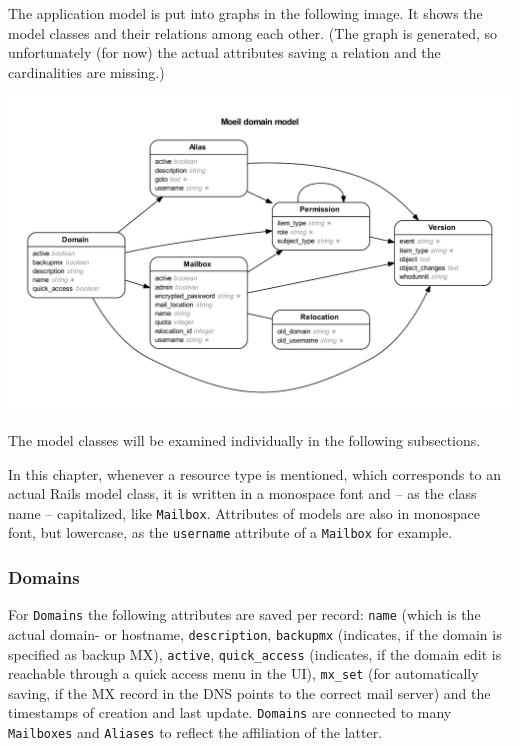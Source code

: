\documentclass[12pt,a4paper]{scrartcl}
\begin{document}
			The application model is put into graphs in the following image. It
			shows the model classes and their relations among each other. (The
			graph is generated, so unfortunately (for now) the actual
			attributes saving a relation and the cardinalities are missing.)

			\includegraphics[width=\textwidth]{images/erd.pdf}

			The model classes will be examined individually in the following
			subsections.
			\s

			In this chapter, whenever a resource type is mentioned, which
			corresponds to an actual \ac{Rails} model class, it is written in a
			monospace font and -- as the class name -- capitalized, like
			\texttt{Mailbox}. Attributes of models are also in monospace font,
			but lowercase, as the \texttt{username} attribute of a
			\texttt{Mailbox} for example.

			\subsubsection*{Domains}
				For \texttt{Domains} the following attributes are saved per
				record: \texttt{name} (which is the actual domain- or hostname,
				\texttt{description}, \texttt{backupmx} (indicates, if the
				domain is specified as backup MX), \texttt{active},
				\texttt{quick\_access} (indicates, if the domain edit is
				reachable through a quick access menu in the \ac{UI}),
				\texttt{mx\_set} (for automatically saving, if the MX record in
				the DNS points to the correct mail server) and the timestamps
				of creation and last update. \texttt{Domains} are connected to
				many \texttt{Mailboxes} and \texttt{Aliases} to reflect the
				affiliation of the latter.
\end{document}
